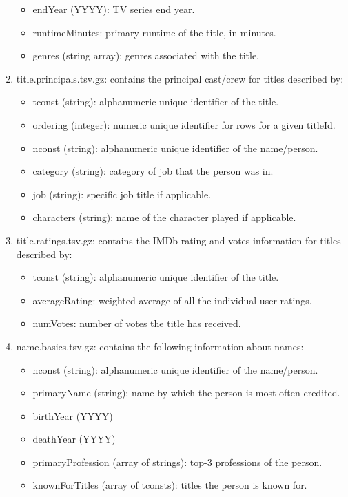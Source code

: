 \documentclass[conference,compsoc]{IEEEtran}
\theoremstyle{definition}
\begin{document}
\begin{enumerate}
\begin{itemize}
        \item endYear (YYYY): TV series end year. 
        \item runtimeMinutes: primary runtime of the title, in minutes.
        \item genres (string array): genres associated with the title.
    \end{itemize}
    \item title.principals.tsv.gz: contains the principal cast/crew for titles described by:
    \begin{itemize}
        \item tconst (string): alphanumeric unique identifier of the title.
        \item ordering (integer): numeric unique identifier for rows for a given titleId.
        \item nconst (string): alphanumeric unique identifier of the name/person.
        \item category (string): category of job that the person was in.
        \item job (string): specific job title if applicable.
        \item characters (string): name of the character played if applicable.
    \end{itemize}
    \item title.ratings.tsv.gz: contains the IMDb rating and votes information for titles described by:
    \begin{itemize}
        \item tconst (string): alphanumeric unique identifier of the title.
        \item averageRating: weighted average of all the individual user ratings.
        \item numVotes: number of votes the title has received.
    \end{itemize}
    \item name.basics.tsv.gz: contains the following information about names:
    \begin{itemize}
        \item nconst (string): alphanumeric unique identifier of the name/person.
        \item primaryName (string): name by which the person is most often credited.
        \item birthYear (YYYY)
        \item deathYear (YYYY)
        \item primaryProfession (array of strings): top-3 professions of the person.
        \item knownForTitles (array of tconsts): titles the person is known for.

    \end{itemize}
\end{enumerate}
\end{document}

